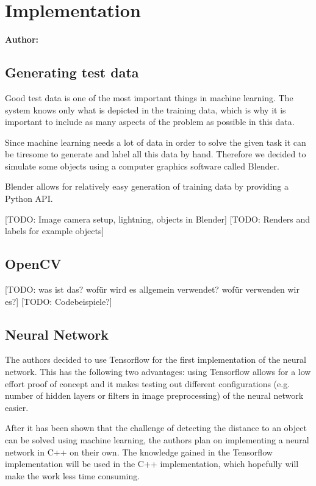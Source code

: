 \chapter{Implementation}

\textbf{Author: } 

\section{Generating test data}
Good test data is one of the most important things in machine learning. The system knows only what is depicted in the training data, which is why it is important to include as many aspects of the problem as possible in this data.

Since machine learning needs a lot of data in order to solve the given task it can be tiresome to generate and label all this data by hand. Therefore we decided to simulate some objects using a computer graphics software called Blender.

Blender allows for relatively easy generation of training data by providing a Python API.

[TODO: Image camera setup, lightning, objects in Blender]
[TODO: Renders and labels for example objects]

\section{OpenCV}

[TODO: was ist das? wofür wird es allgemein verwendet? wofür verwenden wir es?]
[TODO: Codebeispiele?]

\section{Neural Network}
The authors decided to use Tensorflow for the first implementation of the neural network. This has the following two advantages: using Tensorflow allows for a low effort proof of concept and it makes testing out different configurations (e.g. number of hidden layers or filters in image preprocessing) of the neural network easier.

After it has been shown that the challenge of detecting the distance to an object can be solved using machine learning, the authors plan on implementing a neural network in C++ on their own. The knowledge gained in the Tensorflow implementation will be used in the C++ implementation, which hopefully will make the work less time consuming.

